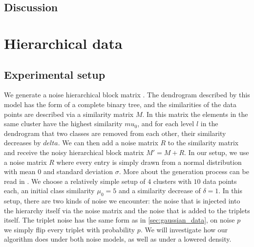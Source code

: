 
\subsection{Discussion}

\section{Hierarchical data}\label{sec:hierarchical_data}
\subsection{Experimental setup}
We generate a noise hierarchical block matrix \citep{balakrishnanNoiseThresholdsSpectral2011}.
The dendrogram described by this model has the form of a complete binary tree, and the similarities of the data points are described via a similarity matrix $M$.
In this matrix the elements in the same cluster have the highest similarity $mu_0$, and for each level $l$ in the dendrogram that two classes are removed
from each other, their similarity decreases by $delta$. We can then add a noise matrix $R$ to the similarity matrix and receive the noisy hierarchical block matrix $M' = M + R$. 
In our setup, we use a noise matrix $R$ where every entry is simply drawn from a normal distribution with mean $0$ and standard deviation $\sigma$.
More about the generation process can be read in \cite{ghoshdastidarFoundationsComparisonBasedHierarchical2019}.
We choose a relatively simple setup of $4$ clusters with $10$ data points each, an initial class similarity $\mu_0 = 5$ and a similarity decrease of $\delta = 1$.
In this setup, there are two kinds of noise we encounter: the noise that is injected into the hierarchy itself via the noise matrix and the noise that is added to the triplets itself.
The triplet noise has the same form as in \autoref{sec:gaussian_data}, on noise $p$ we simply flip every triplet with probability $p$. We will investigate how our algorithm does
under both noise models, as well as under a lowered density.

